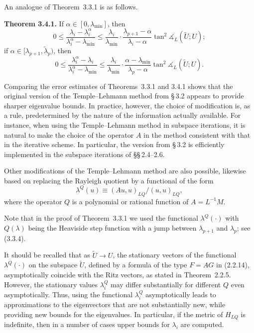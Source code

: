 \documentclass[11pt,oneside]{book}
\newcommand{\ang}{\measuredangle}
\begin{document}
An analogue of Theorem~3.3.1 is as follows.

\textbf{Theorem 3.4.1.} If $\alpha \in [0, \lambda_{\min}]$, then
\[
0 \leqslant \frac{\lambda_i - \lambda_i^\alpha}{\lambda_i^\alpha - \lambda_{\min}} \leqslant \frac{\lambda_i}{\lambda_{\min}} \cdot \frac{\lambda_{p+1} - \alpha}{\lambda_i - \alpha} \tan^2 \ang_L(\widetilde{U}; U);
\tag{3.4.4}
\]
if $\alpha \in [\lambda_{p+1}, \tilde{\lambda}_p)$, then
\[
0 \leqslant \frac{\lambda_i^\alpha - \lambda_i}{\lambda_i^\alpha - \lambda_{\min}} \leqslant \frac{\lambda_i}{\lambda_{\min}} \cdot \frac{\alpha - \lambda_{\min}}{\lambda_p - \alpha} \tan^2 \ang_L(\widetilde{U}; U).
\tag{3.4.5}
\]

Comparing the error estimates of Theorems~3.3.1 and 3.4.1 shows that the original version of the Temple--Lehmann method from \S\,3.2 appears to provide sharper eigenvalue bounds. In practice, however, the choice of modification is, as a rule, predetermined by the nature of the information actually available. For instance, when using the Temple--Lehmann method in subspace iterations, it is natural to make the choice of the operator $A$ in the method consistent with that in the iterative scheme. In particular, the version from \S\,3.2 is efficiently implemented in the subspace iterations of \S\S\,2.4--2.6.

Other modifications of the Temple--Lehmann method are also possible, likewise based on replacing the Rayleigh quotient by a functional of the form
\[
\lambda^Q(u) \equiv (Au, u)_{LQ} / (u, u)_{LQ},
\]
where the operator $Q$ is a polynomial or rational function of $A = L^{-1}M$.

Note that in the proof of Theorem~3.3.1 we used the functional $\lambda^Q(\cdot)$ with $Q(\lambda)$ being the Heaviside step function with a jump between $\lambda_{p+1}$ and $\lambda_p$; see (3.3.4).

It should be recalled that as $\widetilde{U} \to U$, the stationary vectors of the functional $\lambda^Q(\cdot)$ on the subspace $\widetilde{U}$, defined by a formula of the type $F = AG$ in (2.2.14), asymptotically coincide with the Ritz vectors, as stated in Theorem~2.2.5. However, the stationary values $\lambda_i^Q$ may differ substantially for different $Q$ even asymptotically. Thus, using the functional $\lambda_i^Q$ asymptotically leads %
to approximations to the eigenvectors that are not substantially new, while providing new bounds for the eigenvalues. In particular, if the metric of $H_{LQ}$ is indefinite, then in a number of cases upper bounds for $\lambda_i$ are computed.
\end{document}
